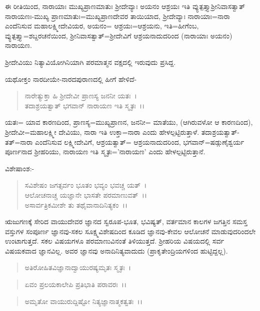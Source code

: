 ಈ ರೀತಿಯಿಂದ, ನಾರಾಯಾಃ ಮುಖ್ಯಪ್ರಾಣಮಾತುಃ ಶ‍್ರೀದೇವ್ಯಾಃ ಅಯನಂ ಆಶ್ರಯಃ ಇತಿ ವ್ಯುತ್ಪತ್ತ್ಯಾಶ‍್ರೀನಿವಾಸತ್ವಾತ್ ನಾರಾಯಣಃ-ಮುಖ್ಯ ಪ್ರಾಣಮಾತುಃ=ಮುಖ್ಯಪ್ರಾಣದೇವರ ತಾಯಿಯಾದ, ಶ‍್ರೀದೇವ್ಯಾಃ ನಾರಾಯಾಃ=ನಾರಾ ಎಂದೆನಿಸುವ ಮಹಾಲಕ್ಷ್ಮೀದೇವಿಯರ, ಅಯನಂ= ಆಶ್ರಯಃ=ಆಶ್ರಯನು, ಇತಿ=ಹೀಗೆಂಬ, ವ್ಯುತ್ಪತ್ತ್ಯಾ=ಶಬ್ದರಚನೆಯಿಂದ, ಶ‍್ರೀನಿವಾಸತ್ವಾತ್=ಶ‍್ರೀದೇವಿಗೆ ಆಶ್ರಯನಾದುದರಿಂದ (ನಾರಾಯಾಃ ಅಯನಂ) ನಾರಾಯಣ.

ಶ‍್ರೀದೇವಿಯು ನಿತ್ಯಾವಿಯೋಗಿನಿಯಾಗಿ ಪರಮಾತ್ಮನ ವಕ್ಷದಲ್ಲಿ ಇರುವುದು ಪ್ರಸಿದ್ದ.

ಯಥೋಕ್ತಂ ನಾರದೀಯೇ-ನಾರದಪುರಾಣದಲ್ಲಿ ಹೀಗೆ ಹೇಳಿದೆ-

\begin{verse}
ನಾರೇತ್ಯುಕ್ತಾ ಹಿ ಶ‍್ರೀದೇವೀ ಪ್ರಾಣಸ್ಯ ಜನನೀ ಯತಃ~।\\ ತದಾಶ್ರಯತ್ವಾತ್ ಭಗವಾನ್ ನಾರಾಯಣ ಇತಿ ಸ್ಮೃತಃ~।।
\end{verse}

\noindent
ಯತಃ= ಯಾವ ಕಾರಣದಿಂದ, ಪ್ರಾಣಸ್ಯ=ಮುಖ್ಯಪ್ರಾಣನ, ಜನನೀ= ಮಾತೆಯು, (ಆಗಿರುವಳೋ ಆ ಕಾರಣದಿಂದ), ಶ‍್ರೀದೇವೀ=ಮಹಾಲಕ್ಷ್ಮೀ ದೇವಿಯು, ನಾರಾ ಇತಿ ಉಕ್ತಾ=ನಾರಾ ಎಂದು ಹೇಳಲ್ಪಟ್ಟಿರುತ್ತಾಳೆ. ತದಾಶ್ರಯತ್ವಾತ್-ತತ್=ನಾರಾ ಎಂದೆನಿಸುವ ಲಕ್ಷ್ಮೀದೇವಿಗೆ, ಆಶ್ರಯತ್ವಾತ್= ಆಶ್ರಯನಾದುದರಿಂದ, ಭಗವಾನ್=ಷಡ್ಗುಣೈಶ್ವರ್ಯ ಪೂರ್ಣನಾದ ಶ‍್ರೀಹರಿಯು, ನಾರಾಯಣ ಇತಿ ಸ್ಮೃತಃ='ನಾರಾಯಣ' ಎಂದು ಹೇಳಲ್ಪಟ್ಟಿರುತ್ತಾನೆ.

ವಿಶೇಷಾಂಶ:-

\begin{verse}
ಸವಿಶೇಷಂ ಜಗತ್ಸರ್ವಂ ಭೂತಂ ಭವ್ಯಂ ಭವಚ್ಚ ಯತ್~।\\ ಆಲೋಚನಾಚ್ಚ ಯಜ್ಞಾನೇ ಭಾಸತೇ ಪರಮಾಣುವತ್~।।\\ ಅಸಾರ್ವತ್ರಿಕಮೀಶೇ ತು ತಥೈವಾನಾದಿನಿತ್ಯಕಂ~।।
\end{verse}


ಋಜುಗಣಕ್ಕೆ ಸೇರಿದ ವಾಯುದೇವರ ಜ್ಞಾನದ ಸ್ವರೂಪ-ಭೂತ, ಭವಿಷ್ಯತ್, ವರ್ತಮಾನ ಕಾಲಗಳ ಜಗತ್ತಿನ ಸಮಸ್ತ ವಸ್ತುಗಳ ಸಂಪೂರ್ಣ ಜ್ಞಾನವು-ಸಕಲ ಸೂಕ್ಷ್ಮವಿಶೇಷದಿಂದ ಕೂಡಿದ ಜ್ಞಾನವು-ಕೇವಲ ಆಲೋಚನೆ ಮಾಡುವುದರಿಂದಲೇ ಉಂಟಾಗುತ್ತದೆ. ಸಕಲ ವಿಷಯಗಳೂ ಪರಮಾಣುವಿನಂತೆ ತಿಳಿಯುತ್ತದೆ. ಶ‍್ರೀಹರಿಯ ವಿಷಯದಲ್ಲಿ ಸರ್ವ ವಿಷಯಕವಾದ ಜ್ಞಾನವಿಲ್ಲ. ಅವರ ಜ್ಞಾನವು ಅನಾದಿನಿತ್ಯವಾದುದು (ಪ್ರಾಕೃತೇಂದ್ರಿಯಗಳಿಂದ ಹುಟ್ಟಿದ್ದಲ್ಲ).

\begin{verse}
ಅತಿರೋಹಿತವಿಜ್ಞಾನಾದ್ವಾಯುರಷ್ಯಮೃತಃ ಸ್ಮೃತಃ~।
\end{verse}


\begin{verse}
ಏವಂ ಪ್ರಲಯಕಾಲೇಪಿ ಪ್ರತಿಭಾತಿ ಪರಾವರಃ~।।
\end{verse}


\begin{verse}
ಅಮೃತೋ ವಾಯುರುದ್ದಿಷ್ಟೋ ನಿತ್ಯಜ್ಞಾನಾತ್ಮಕತ್ವತಃ~।।
\end{verse}

